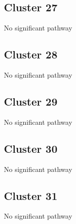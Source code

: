 \documentclass{article}
\begin{document}
\subsection{Cluster 27 }
No significant pathway
\subsection{Cluster 28 }
No significant pathway
\subsection{Cluster 29 }
No significant pathway
\subsection{Cluster 30 }
No significant pathway
\subsection{Cluster 31 }
No significant pathway
\end{document}
